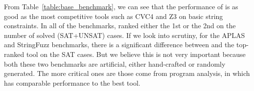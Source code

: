 

From Table~\ref{table:base_benchmark}, we can see that the performance of {\tool} is as good as the most competitive tools such as CVC4 and Z3 on basic string constraints. In all of the benchmarks, {\tool} ranked either the 1st or the 2nd on the number of solved (SAT+UNSAT) cases. If we look into scrutiny, for the APLAS and StringFuzz benchmarks, there is a significant difference between {\tool} and the top-ranked tool on the SAT cases. But we believe this is not very important because both these two benchmarks are artificial, either hand-crafted or randomly generated. The more critical ones are those come from program analysis, in which {\tool} has comparable performance to the best tool.

